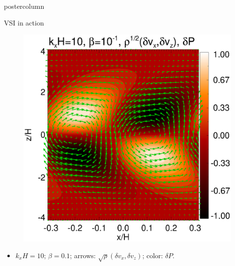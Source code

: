 \documentclass[final,hyperref={pdfpagelabels=false}]{beamer}
\begin{document}
\begin{frame}
\begin{columns}
\begin{column}{.49\textwidth}
\begin{beamercolorbox}[center,wd=\textwidth]{postercolumn}
\begin{minipage}[T]{.95\textwidth}
{              
              \begin{block}{{\Large VSI in action}}
                \justifying
                \begin{figure}
                  \includegraphics[width=\linewidth,clip=true,trim=0cm
                  0cm 0cm 1cm]{figures/result2d_cool}
                \end{figure}
                 \vspace{-2cm}
                 \begin{itemize}
                 \item $k_xH=10$; $\beta=0.1$; arrows: $\sqrt{\rho}(\delta
                   v_x,\delta v_z)$;
                   color: $\delta P$.
                 
                 \end{itemize}
              \end{block}
              
}
\end{minipage}
\end{beamercolorbox}
\end{column}
\end{columns}
\end{frame}
\end{document}
